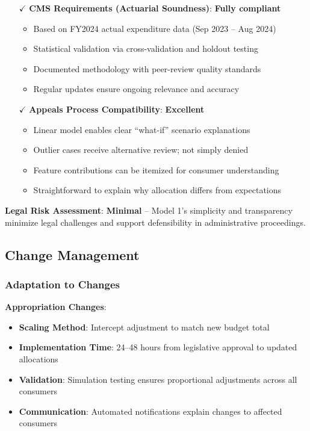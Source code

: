 \begin{itemize}
    \item[$\checkmark$] \textbf{CMS Requirements (Actuarial Soundness)}: \textbf{Fully compliant}
    \begin{itemize}
        \item Based on FY2024 actual expenditure data (Sep 2023 -- Aug 2024)
        \item Statistical validation via cross-validation and holdout testing
        \item Documented methodology with peer-review quality standards
        \item Regular updates ensure ongoing relevance and accuracy
    \end{itemize}
    
    \item[$\checkmark$] \textbf{Appeals Process Compatibility}: \textbf{Excellent}
    \begin{itemize}
        \item Linear model enables clear ``what-if'' scenario explanations
        \item Outlier cases receive alternative review; not simply denied
        \item Feature contributions can be itemized for consumer understanding
        \item Straightforward to explain why allocation differs from expectations
    \end{itemize}
\end{itemize}

\textbf{Legal Risk Assessment}: \textbf{Minimal} -- Model 1's simplicity and transparency minimize legal challenges and support defensibility in administrative proceedings.

\subsection{Change Management}

\subsubsection{Adaptation to Changes}

\textbf{Appropriation Changes}:
\begin{itemize}
    \item \textbf{Scaling Method}: Intercept adjustment to match new budget total
    \item \textbf{Implementation Time}: 24--48 hours from legislative approval to updated allocations
    \item \textbf{Validation}: Simulation testing ensures proportional adjustments across all consumers
    \item \textbf{Communication}: Automated notifications explain changes to affected consumers
\end{itemize}

